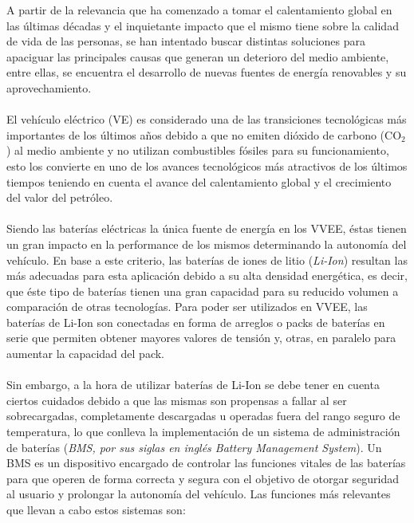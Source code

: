 \documentclass[10pt,a4paper]{article}
\begin{document}
\noindent A partir de la relevancia que ha comenzado a tomar el calentamiento global en las últimas décadas y el inquietante impacto que el mismo tiene sobre la calidad de vida de las personas, se han intentado buscar distintas soluciones para apaciguar las principales causas que generan un deterioro del medio ambiente, entre ellas, se encuentra el desarrollo de nuevas fuentes de energía renovables y su aprovechamiento.\\ 
\\
\noindent El vehículo eléctrico (VE) es considerado una de las transiciones tecnológicas más importantes de los últimos años debido a que no emiten dióxido de carbono ($\mathrm{CO_2}$) al medio ambiente y no utilizan combustibles fósiles para su funcionamiento, esto los convierte en uno de los avances tecnológicos más atractivos de los últimos tiempos teniendo en cuenta el avance del calentamiento global y el crecimiento del valor del petróleo.\\
\\
\noindent Siendo las baterías eléctricas la única fuente de energía en los VVEE, éstas tienen un gran impacto en la performance de los mismos determinando la autonomía del vehículo. En base a este criterio, las baterías de iones de litio (\emph{Li-Ion}) resultan las más adecuadas para esta aplicación debido a su alta densidad energética, es decir, que éste tipo de baterías tienen una gran capacidad para su reducido volumen a comparación de otras tecnologías. Para poder ser utilizados en VVEE, las baterías de Li-Ion son conectadas en forma de arreglos o packs de baterías en serie que permiten obtener mayores valores de tensión y, otras, en paralelo para aumentar la capacidad del pack. \\
\\
\noindent Sin embargo, a la hora de utilizar baterías de Li-Ion se debe tener en cuenta ciertos cuidados debido a que las mismas son propensas a fallar al ser sobrecargadas, completamente descargadas u operadas fuera del rango seguro de temperatura, lo que conlleva la implementación de un sistema de administración de baterías (\emph{BMS, por sus siglas en inglés Battery Management System}). Un BMS es un dispositivo encargado de controlar las funciones vitales de las baterías para que operen de forma correcta y segura con el objetivo de otorgar seguridad al usuario y prolongar la autonomía del vehículo. Las funciones más relevantes que llevan a cabo estos sistemas son:
\end{document}
